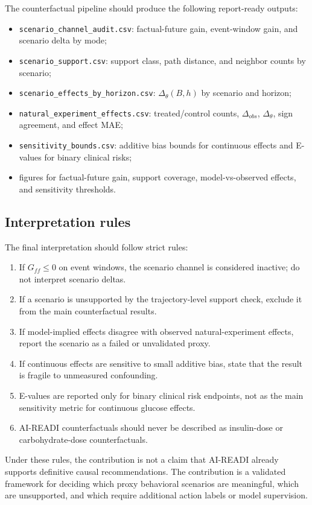 The counterfactual pipeline should produce the following report-ready outputs:
\begin{itemize}
    \item \texttt{scenario\_channel\_audit.csv}: factual-future gain, event-window gain, and scenario delta by mode;
    \item \texttt{scenario\_support.csv}: support class, path distance, and neighbor counts by scenario;
    \item \texttt{scenario\_effects\_by\_horizon.csv}: $\Delta_\theta(B,h)$ by scenario and horizon;
    \item \texttt{natural\_experiment\_effects.csv}: treated/control counts, $\Delta_{obs}$, $\Delta_\theta$, sign agreement, and effect MAE;
    \item \texttt{sensitivity\_bounds.csv}: additive bias bounds for continuous effects and E-values for binary clinical risks;
    \item figures for factual-future gain, support coverage, model-vs-observed effects, and sensitivity thresholds.
\end{itemize}

\subsection{Interpretation rules}
\label{subsec:cf_interpretation_rules}

The final interpretation should follow strict rules:
\begin{enumerate}
    \item If $G_{ff}\leq 0$ on event windows, the scenario channel is considered inactive; do not interpret scenario deltas.
    \item If a scenario is unsupported by the trajectory-level support check, exclude it from the main counterfactual results.
    \item If model-implied effects disagree with observed natural-experiment effects, report the scenario as a failed or unvalidated proxy.
    \item If continuous effects are sensitive to small additive bias, state that the result is fragile to unmeasured confounding.
    \item E-values are reported only for binary clinical risk endpoints, not as the main sensitivity metric for continuous glucose effects.
    \item AI-READI counterfactuals should never be described as insulin-dose or carbohydrate-dose counterfactuals.
\end{enumerate}

Under these rules, the contribution is not a claim that AI-READI already supports definitive causal recommendations. The contribution is a validated framework for deciding which proxy behavioral scenarios are meaningful, which are unsupported, and which require additional action labels or model supervision.

